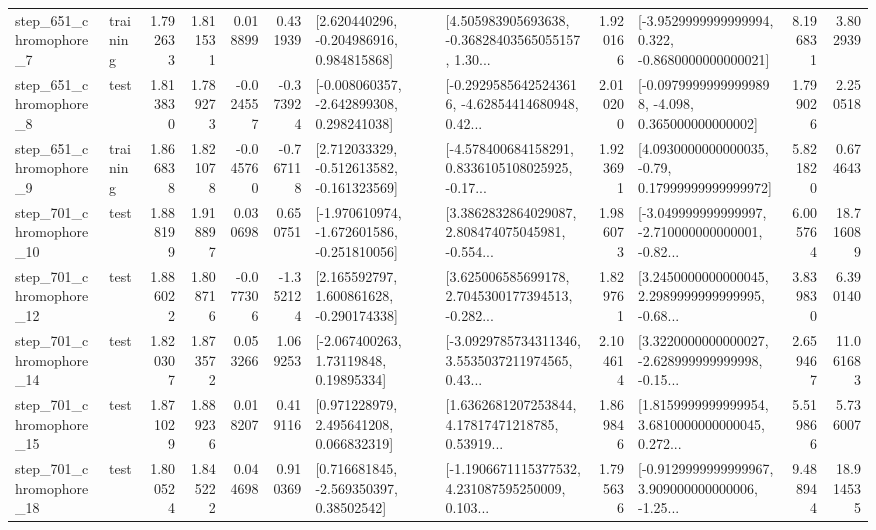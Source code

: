 \begin{tabular}{llrrrrllrlrr}
   step\_651\_chromophore\_7 &  training &      1.792633 &    1.811531 &      0.018899 &  0.431939 &    [2.620440296, -0.204986916, 0.984815868] &  [4.505983905693638, -0.36828403565055157, 1.30... &       1.920166 &  [-3.9529999999999994, 0.322, -0.8680000000000021] &            8.196831 &          3.802939 \\
   step\_651\_chromophore\_8 &      test &      1.813830 &    1.789273 &     -0.024557 & -0.373924 &   [-0.008060357, -2.642899308, 0.298241038] &  [-0.29295856425243616, -4.62854414680948, 0.42... &       2.010200 &  [-0.09799999999999898, -4.098, 0.365000000000002] &            1.799026 &          2.250518 \\
   step\_651\_chromophore\_9 &  training &      1.866838 &    1.821078 &     -0.045760 & -0.767118 &   [2.712033329, -0.512613582, -0.161323569] &  [-4.578400684158291, 0.8336105108025925, -0.17... &       1.923691 &   [4.0930000000000035, -0.79, 0.17999999999999972] &            5.821820 &          0.674643 \\
  step\_701\_chromophore\_10 &      test &      1.888199 &    1.918897 &      0.030698 &  0.650751 &  [-1.970610974, -1.672601586, -0.251810056] &  [3.3862832864029087, 2.808474075045981, -0.554... &       1.986073 &  [-3.049999999999997, -2.710000000000001, -0.82... &            6.005764 &         18.716089 \\
  step\_701\_chromophore\_12 &      test &      1.886022 &    1.808716 &     -0.077306 & -1.352124 &    [2.165592797, 1.600861628, -0.290174338] &  [3.625006585699178, 2.7045300177394513, -0.282... &       1.829761 &  [3.2450000000000045, 2.2989999999999995, -0.68... &            3.839830 &          6.390140 \\
  step\_701\_chromophore\_14 &      test &      1.820307 &    1.873572 &      0.053266 &  1.069253 &      [-2.067400263, 1.73119848, 0.19895334] &  [-3.0929785734311346, 3.5535037211974565, 0.43... &       2.104614 &  [3.3220000000000027, -2.628999999999998, -0.15... &            2.659467 &         11.061683 \\
  step\_701\_chromophore\_15 &      test &      1.871029 &    1.889236 &      0.018207 &  0.419116 &     [0.971228979, 2.495641208, 0.066832319] &  [1.6362681207253844, 4.17817471218785, 0.53919... &       1.869846 &  [1.8159999999999954, 3.6810000000000045, 0.272... &            5.519866 &          5.736007 \\
  step\_701\_chromophore\_18 &      test &      1.800524 &    1.845222 &      0.044698 &  0.910369 &     [0.716681845, -2.569350397, 0.38502542] &  [-1.1906671115377532, 4.231087595250009, 0.103... &       1.795636 &  [-0.9129999999999967, 3.909000000000006, -1.25... &            9.488944 &         18.914535 \\

\end{tabular}
